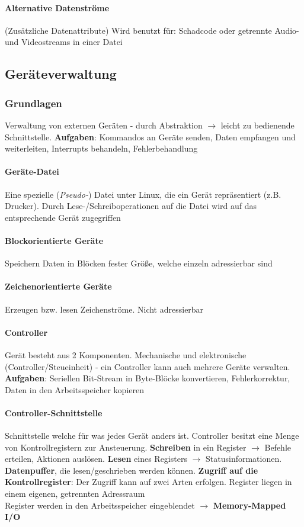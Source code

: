 \documentclass[11pt,a4paper,landscape]{article}
\begin{document}
\begin{multicols*}{3}
	\paragraph{Alternative Datenströme} (Zusätzliche Datenattribute) Wird benutzt für: Schadcode oder getrennte Audio- und Videostreams in einer Datei
	\subsection{Geräteverwaltung}
	\subsubsection{Grundlagen}
	Verwaltung von externen Geräten - durch Abstraktion $\rightarrow$ leicht zu bedienende Schnittstelle. \textbf{Aufgaben}: Kommandos an Geräte senden, Daten empfangen und weiterleiten, Interrupts behandeln, Fehlerbehandlung
	\paragraph{Geräte-Datei} Eine spezielle (\textit{Pseudo-}) Datei unter Linux, die ein Gerät repräsentiert (z.B. Drucker). Durch Lese-/Schreiboperationen auf die Datei wird auf das entsprechende Gerät zugegriffen
	\paragraph{Blockorientierte Geräte} Speichern Daten in Blöcken fester Größe, welche einzeln adressierbar sind
	\paragraph{Zeichenorientierte Geräte} Erzeugen bzw. lesen Zeichenströme. Nicht adressierbar
	\paragraph{Controller} Gerät besteht aus 2 Komponenten. Mechanische und elektronische (Controller/Steueinheit) - ein Controller kann auch mehrere Geräte verwalten. \textbf{Aufgaben}: Seriellen Bit-Stream in Byte-Blöcke konvertieren, Fehlerkorrektur, Daten in den Arbeitsspeicher kopieren
	\paragraph{Controller-Schnittstelle} Schnittstelle welche für was jedes Gerät anders ist. Controller besitzt eine Menge von Kontrollregistern zur Ansteuerung. \textbf{Schreiben} in ein Register $\rightarrow$ Befehle erteilen, Aktionen auslösen. \textbf{Lesen} eines Registers $\rightarrow$ Statusinformationen. \textbf{Datenpuffer}, die lesen/geschrieben werden können. \textbf{Zugriff auf die Kontrollregister}: Der Zugriff kann auf zwei Arten erfolgen. Register liegen in einem eigenen, getrennten Adressraum\\
	Register werden in den Arbeitsspeicher eingeblendet $\rightarrow$ \textbf{Memory-Mapped I/O}

\end{multicols*}
\end{document}
